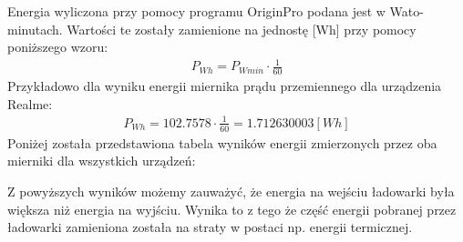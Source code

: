 \documentclass[11pt]{article}
\begin{document}
    Energia wyliczona przy pomocy programu OriginPro podana jest w Wato-minutach. Wartości te zostały zamienione na jednostę [Wh] przy pomocy poniższego
    wzoru:
    \begin{gather*}
        P_{Wh}=P_{Wmin}\cdot \frac{1}{60}
    \end{gather*}
    \noindent Przykładowo dla wyniku energii miernika prądu przemiennego dla urządzenia Realme:
    \begin{gather*}
        P_{Wh}=102.7578\cdot \frac{1}{60}=1.712630003[Wh]
    \end{gather*}
    \newpage
    \indent Poniżej została przedstawiona tabela wyników energii zmierzonych przez oba mierniki dla wszystkich urządzeń:
    \begin{center}
    \end{center}
    \par Z powyższych wyników możemy zauważyć, że energia na wejściu ładowarki była większa niż energia na wyjściu. Wynika to z tego
    że część energii pobranej przez ładowarki zamieniona została na straty w postaci np. energii termicznej.
\end{document}
